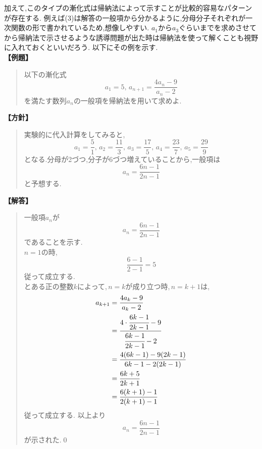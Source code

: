 加えて,このタイプの漸化式は帰納法によって示すことが比較的容易なパターンが存在する.
例えば(3)は解答の一般項から分かるように,分母分子それぞれが一次関数の形で書かれているため,想像しやすい.
$a_1$から$a_3$ぐらいまでを求めさせてから帰納法で示させるような誘導問題が出た時は帰納法を使って解くことも視野に入れておくといいだろう.
以下にその例を示す.\\
  \noindent\textbf{【例題】}
  \begin{quote}
    以下の漸化式
    \[
      a_1=5,\, a_{n+1}=\dfrac{4a_{n}-9}{a_{n}-2}
    \]
    を満たす数列$a_n$の一般項を帰納法を用いて求めよ.
  \end{quote}
  \textbf{【方針】}
  \begin{quote}
    実験的に代入計算をしてみると,
    \[
      a_1=\frac{5}{1},\,a_2=\frac{11}{3},\,a_3=\frac{17}{5},\,a_4=\frac{23}{7},\,a_5=\frac{29}{9}
    \]
    となる.分母が2づつ,分子が6づつ増えていることから,一般項は
    \[
      a_n=\frac{6n-1}{2n-1}
    \]
    と予想する.
  \end{quote}
  \textbf{【解答】}
  \begin{quote}
    一般項$a_n$が
    \[
      a_n=\frac{6n-1}{2n-1}
    \]
    であることを示す.\\
    $n=1$の時,
    \[
      \frac{6-1}{2-1}=5
    \]
    従って成立する.\\
    とある正の整数$k$によって,\,$n=k$が成り立つ時,\,$n=k+1$は,
      \begin{align*}
        a_{k+1}&=\frac{4a_{k}-9}{a_{k}-2}\\
        &=\cfrac{4\cdot \cfrac{6k-1}{2k-1}-9}{\cfrac{6k-1}{2k-1}-2}\\
        &=\frac{4(6k-1)-9(2k-1)}{6k-1-2(2k-1)}\\
        &=\frac{6k+5}{2k+1}\\
        &=\frac{6(k+1)-1}{2(k+1)-1}
    \end{align*}
    従って成立する.
    以上より
    \[
      a_n=\frac{6n-1}{2n-1}
    \]
    が示された.\qed
\end{quote}
